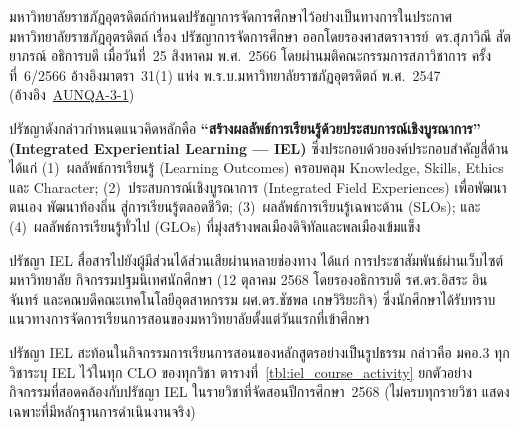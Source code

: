 


มหาวิทยาลัยราชภัฏอุตรดิตถ์กำหนดปรัชญาการจัดการศึกษาไว้อย่างเป็นทางการในประกาศมหาวิทยาลัยราชภัฏอุตรดิตถ์ เรื่อง ปรัชญาการจัดการศึกษา ออกโดยรองศาสตราจารย์~ดร.สุภาวิณี สัตยาภรณ์ อธิการบดี เมื่อวันที่~25 สิงหาคม พ.ศ.~2566 โดยผ่านมติคณะกรรมการสภาวิชาการ ครั้งที่~6/2566 อ้างอิงมาตรา~31(1) แห่ง พ.ร.บ.มหาวิทยาลัยราชภัฏอุตรดิตถ์ พ.ศ.~2547 (อ้างอิง~\hyperlink{ref:AUNQA-3-1}{AUNQA-3-1})

ปรัชญาดังกล่าวกำหนดแนวคิดหลักคือ \textbf{``สร้างผลลัพธ์การเรียนรู้ด้วยประสบการณ์เชิงบูรณาการ'' (Integrated Experiential Learning --- IEL)} ซึ่งประกอบด้วยองค์ประกอบสำคัญสี่ด้าน ได้แก่ (1)~ผลลัพธ์การเรียนรู้ (Learning Outcomes) ครอบคลุม Knowledge, Skills, Ethics และ Character; (2)~ประสบการณ์เชิงบูรณาการ (Integrated Field Experiences) เพื่อพัฒนาตนเอง พัฒนาท้องถิ่น สู่การเรียนรู้ตลอดชีวิต; (3)~ผลลัพธ์การเรียนรู้เฉพาะด้าน (SLOs); และ (4)~ผลลัพธ์การเรียนรู้ทั่วไป (GLOs) ที่มุ่งสร้างพลเมืองดิจิทัลและพลเมืองเข้มแข็ง

ปรัชญา IEL สื่อสารไปยังผู้มีส่วนได้ส่วนเสียผ่านหลายช่องทาง ได้แก่ การประชาสัมพันธ์ผ่านเว็บไซต์มหาวิทยาลัย กิจกรรมปฐมนิเทศนักศึกษา (12 ตุลาคม 2568 โดยรองอธิการบดี รศ.ดร.อิสระ อินจันทร์ และคณบดีคณะเทคโนโลยีอุตสาหกรรม ผศ.ดร.ชัชพล เกษวิริยะกิจ) ซึ่งนักศึกษาได้รับทราบแนวทางการจัดการเรียนการสอนของมหาวิทยาลัยตั้งแต่วันแรกที่เข้าศึกษา

ปรัชญา IEL สะท้อนในกิจกรรมการเรียนการสอนของหลักสูตรอย่างเป็นรูปธรรม กล่าวคือ มคอ.3 ทุกวิชาระบุ IEL ไว้ในทุก CLO ของทุกวิชา ตารางที่~\ref{tbl:iel_course_activity} ยกตัวอย่างกิจกรรมที่สอดคล้องกับปรัชญา IEL ในรายวิชาที่จัดสอนปีการศึกษา~2568 (ไม่ครบทุกรายวิชา แสดงเฉพาะที่มีหลักฐานการดำเนินงานจริง)

